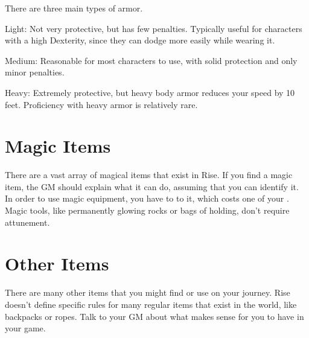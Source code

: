  There are three main types of armor.
  \begin{raggeditemize}
    \item Light: Not very protective, but has few penalties. Typically useful for characters with a high Dexterity, since they can dodge more easily while wearing it.
    \item Medium: Reasonable for most characters to use, with solid protection and only minor penalties.
    \item Heavy: Extremely protective, but heavy body armor reduces your speed by 10 feet. Proficiency with heavy armor is relatively rare.
  \end{raggeditemize}

\section{Magic Items}
  There are a vast array of magical items that exist in Rise.
  If you find a magic item, the GM should explain what it can do, assuming that you can identify it.
  In order to use magic equipment, you have to  to it, which costs one of your .
  Magic tools, like permanently glowing rocks or bags of holding, don't require attunement.

\section{Other Items}
  There are many other items that you might find or use on your journey.
  Rise doesn't define specific rules for many regular items that exist in the world, like backpacks or ropes.
  Talk to your GM about what makes sense for you to have in your game.
